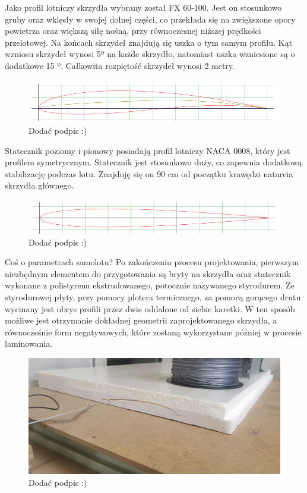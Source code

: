 \documentclass[12pt, a4paper]{article}
\begin{document}
Jako profil lotniczy skrzydła wybrany został FX 60-100. Jest on stosunkowo gruby oraz wklęsły w swojej dolnej części, co przekłada się na zwiększone opory powietrza oraz większą siłę nośną, przy równoczesnej niższej prędkości przelotowej. Na końcach skrzydeł znajdują się uszka o tym samym profilu. Kąt wzniosu skrzydeł wynosi 5º na każde skrzydło, natomiast uszka wzniesione są o dodatkowe 15 º.  Całkowita rozpiętość skrzydeł wynosi 2 metry.
 \begin{figure}[ht]
    \centering
    \includegraphics[width=1\textwidth]{fx60}
    \caption{Dodać podpis :)}
\end{figure}
Statecznik poziomy i pionowy posiadają profil lotniczy NACA 0008, który jest profilem symetrycznym. Statecznik jest stosunkowo duży, co zapewnia dodatkową stabilizację podczas lotu. Znajduję się on 90 cm od początku krawędzi natarcia skrzydła głównego.
 \begin{figure}[ht]
    \centering
    \includegraphics[width=1\textwidth]{naca0008}
    \caption{Dodać podpis :)}
\end{figure}
Coś o parametrach samolotu?
Po zakończeniu procesu projektowania, pierwszym niezbędnym elementem do przygotowania są bryty na skrzydła oraz statecznik wykonane z polistyrenu ekstrudowanego, potocznie nazywanego styrodurem. Ze styrodurowej płyty, przy pomocy plotera termicznego, za pomocą gorącego drutu wycinany jest obrys profili przez dwie oddalone od siebie karetki. W ten sposób możliwe jest otrzymanie dokładnej geometrii zaprojektowanego skrzydła, a równocześnie form negatywowych, które zostaną wykorzystane później w procesie laminowania.
\begin{figure}[ht]
    \centering
    \includegraphics[width=1\textwidth]{budowa5}
    \caption{Dodać podpis :)}
\end{figure}
 
\end{document}
